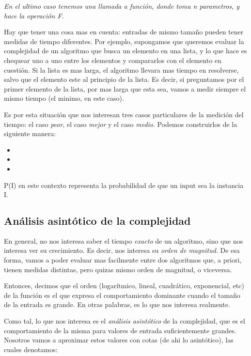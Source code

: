 \documentclass{article}
\begin{document}
\textit{En el ultimo caso tenemos una llamada a función, donde toma n parametros, y hace la operación F.}

Hay que tener una cosa mas en cuenta: entradas de mismo tamaño pueden tener medidas de tiempo diferentes. Por ejemplo, supongamos que queremos evaluar la complejidad de un algoritmo que busca un elemento en una lista, y lo que hace es chequear uno a uno entre los elementos y compararlos con el elemento en cuestión. Si la lista es mas larga, el algoritmo llevara mas tiempo en resolverse, salvo que el elemento este al principio de la lista. Es decir, si preguntamos por el primer elemento de la lista, por mas larga que esta sea, vamos a medir siempre el mismo tiempo (el minimo, en este caso).

Es por esta situación que nos interesan tres casos particulares de la medición del tiempo: el caso \textit{peor}, el caso \textit{mejor} y el caso \textit{medio}. Podemos construirlos de la siguiente manera:

\begin{itemize}
	\item {}
	\item {}
	\item {}
\end{itemize}

P(I) en este contexto representa la probabilidad de que un input sea la instancia I.

\subsection{Análisis asintótico de la complejidad}

En general, no nos interesa saber el tiempo \textit{exacto} de un algoritmo, sino que nos interesa ver su crecimiento. Es decir, nos interesa su \textit{orden de magnitud}. De esa forma, vamos a poder evaluar mas facilmente entre dos algoritmos que, a priori, tienen medidas distintas, pero quizas mismo orden de magnitud, o viceversa.

Entonces, decimos que el orden (logarítmico, lineal, cuadrático, exponencial, etc) de la función  es el que expresa el comportamiento dominante cuando el tamaño de la entrada es grande. En otras palabras, es lo que nos interesa realmente.

Como tal, lo que nos interesa es el \textit{análisis asintótico} de la complejidad, que es el comportamiento de la misma para valores de entrada suficientemente grandes. Nosotros vamos a aproximar estos valores con cotas (de ahi lo asintótico), las cuales denotamos:
\end{document}
